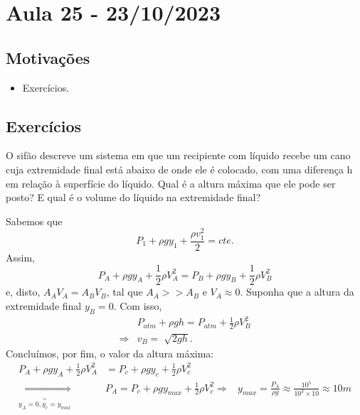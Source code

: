 \documentclass[phsyicsII_notes.tex]{subfiles}
\begin{document}
\section{Aula 25 - 23/10/2023}
\subsection{Motivações}
\begin{itemize}
	\item Exercícios.
\end{itemize}
\subsection{Exercícios}
\begin{example}
	O sifão descreve um sistema em que um recipiente com líquido recebe um cano cuja extremidade final está abaixo de onde ele é colocado, com uma diferença h
	em relação à superfície do líquido. Qual é a altura máxima que ele pode ser posto? E qual é o volume do líquido na extremidade final?

	Sabemos que
	\[
		P_{1} + \rho gy_{1} + \frac{\rho v_{1}^{2}}{2} = cte.
	\]
	Assim,
	\[
		P_{A} + \rho gy_{A} + \frac{1}{2}\rho V_{A}^{2} = P_{B} + \rho gy_{B} + \frac{1}{2}\rho V_{B}^{2}
	\]
	e, disto, \(A_{A}V_{A} = A_{B}V_{B}\), tal que \(A_{A} >> A_{B}\) e \(V_{A}\approx 0\). Suponha que a altura da extremidade final \(y_{B} = 0\). Com isso,
	\begin{align*}
		            & P_{atm} + \rho gh = P_{atm} + \frac{1}{2}\rho V_{B}^{2} \\
		\Rightarrow & v_{B} = \sqrt[]{2gh}.
	\end{align*}
	Concluímos, por fim, o valor da altura máxima:
	\begin{align*}
		P_{A} + \rho gy_{A} + \frac{1}{2}\rho V_{A}^{2}     & = P_{c} + \rho gy_{c} + \frac{1}{2}\rho V_{c}^{2}                                 \\
		\underbrace{\Rightarrow}_{y_{A}=0, y_{c} = y_{max}} & P_{A} = P_{c} + \rho gy_{max} + \frac{1}{2}\rho V_{c}^{2}
		\Rightarrow                                         & y_{max} = \frac{P_{A}}{\rho g} \approx \frac{10^{5}}{10^{3}\times 10} \approx 10m
	\end{align*}
\end{example}
\end{document}

